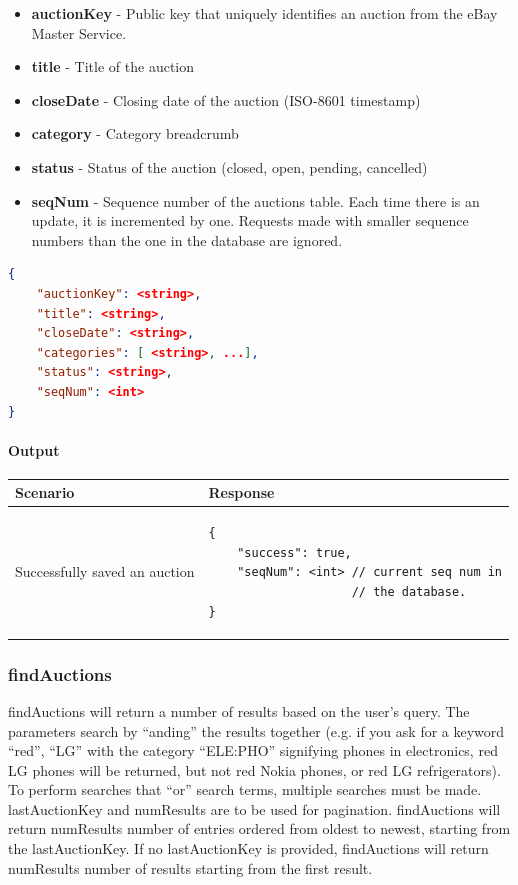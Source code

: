 \documentclass[12pt,a4paper]{article}
\begin{document}
\begin{itemize}
    \item \textbf{auctionKey} - Public key that uniquely identifies an auction from the eBay Master Service.
    \item \textbf{title} - Title of the auction 
    \item \textbf{closeDate} - Closing date of the auction (ISO-8601 timestamp)
    \item \textbf{category} - Category breadcrumb
    \item \textbf{status} - Status of the auction (closed, open, pending, cancelled)
    \item \textbf{seqNum} - Sequence number of the auctions table. Each time
        there is an update, it is incremented by one. Requests made with
        smaller sequence numbers than the one in the database are ignored.
\end{itemize}
\begin{lstlisting}[language=json,numbers=none]
{
    "auctionKey": <string>,
    "title": <string>,
    "closeDate": <string>,
    "categories": [ <string>, ...],
    "status": <string>,
    "seqNum": <int>
}
\end{lstlisting}

\paragraph{Output}
\begin{center}
    \begin{tabular}{| p{5cm} | l |}
        \hline
        \textbf{Scenario} & \textbf{Response} \\
        \hline
        Successfully saved an auction & 
        \begin{lstlisting}[language=tableJson,firstnumber=1]
{
    "success": true,
    "seqNum": <int> // current seq num in
                    // the database.
}

        \end{lstlisting} \\ 
        \hline
    \end{tabular}
\end{center}



\pagebreak
\subsubsection{findAuctions}

findAuctions will return a number of results based on the user's query. The
parameters search by ``anding'' the results together (e.g. if you ask for a
keyword ``red'', ``LG'' with the category ``ELE:PHO'' signifying phones in
electronics, red LG phones will be returned, but not red Nokia phones, or red
LG refrigerators). To perform searches that ``or'' search terms, multiple
searches must be made. lastAuctionKey and numResults are to be used for
pagination. findAuctions will return numResults number of entries ordered from
oldest to newest, starting from the lastAuctionKey. If no lastAuctionKey is
provided, findAuctions will return numResults number of results starting from
the first result.
\end{document}
